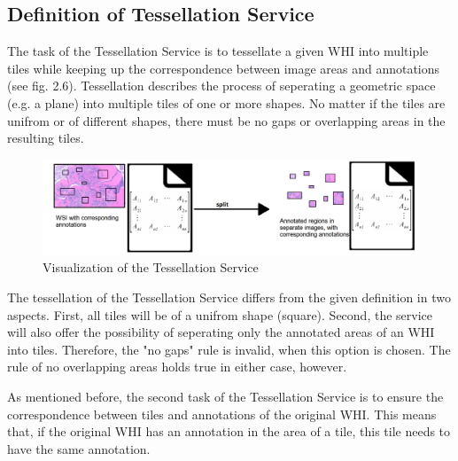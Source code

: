 \subsection{Definition of Tessellation Service}

The task of the Tessellation Service is to tessellate a given WHI into multiple tiles while keeping up the correspondence between image areas and annotations (see fig. 2.6). Tessellation describes the process of seperating a geometric space (e.g. a plane) into multiple tiles of one or more shapes. No matter if the tiles are unifrom or of different shapes, there must be no gaps or overlapping areas in the resulting tiles.

\begin{figure}[H]
	\begin{center}
		\includegraphics[scale=0.3]{img/processChainC.png}
		\caption{Visualization of the Tessellation Service}
		\label{fig:fig2.6}
	\end{center}
\end{figure}

The tessellation of the Tessellation Service differs from the given definition in two aspects. First, all tiles will be of a unifrom shape (square). Second, the service will also offer the possibility of seperating only the annotated areas of an WHI into tiles. Therefore, the "no gaps" rule is invalid, when this option is chosen. The rule of no overlapping areas holds true in either case, however.

As mentioned before, the second task of the Tessellation Service is to ensure the correspondence between tiles and annotations of the original WHI. This means that, if the original WHI has an annotation in the area of a tile, this tile needs to have the same annotation.
